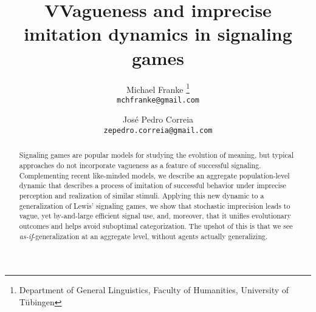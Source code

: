\documentclass{article}
\title{VVagueness and imprecise imitation dynamics in signaling games}
\author{
Michael Franke%
\thanks{Department of General Linguistics, Faculty of Humanities, University of Tübingen}\\
\texttt{mchfranke@gmail.com}
\and
Jos\'e Pedro Correia\\
\texttt{zepedro.correia@gmail.com}
}
\date{}
\begin{document}
\maketitle

\begin{abstract}
  Signaling games are popular models for studying the evolution of meaning, but typical
  approaches do not incorporate vagueness as a feature of successful signaling.  Complementing
  recent like-minded models, we describe an aggregate population-level dynamic that describes a
  process of imitation of successful behavior under imprecise perception and realization of
  similar stimuli. Applying this new dynamic to a generalization of Lewis' signaling games, we
  show that stochastic imprecision leads to vague, yet by-and-large efficient signal use, and,
  moreover, that it unifies evolutionary outcomes and helps avoid suboptimal
  categorization. The upshot of this is that we see \emph{as-if}-generalization at an aggregate
  level, without agents actually generalizing.
\end{abstract}
\end{document}
